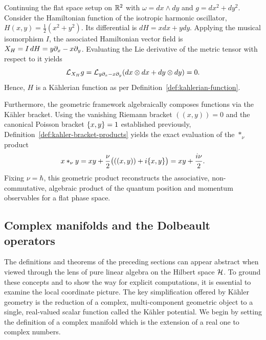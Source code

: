 \begin{example}
	Continuing the flat space setup on $\mathbb{R}^2$ with $\omega=dx\wedge dy$ and $g=dx^2+dy^2$. Consider the Hamiltonian function of the isotropic harmonic oscillator, $H(x,y) = \frac{1}{2}(x^2 + y^2)$.
	Its differential is $dH = x dx + y dy$. Applying the musical isomorphism $I$, the associated Hamiltonian vector field is $X_{H} = I\,dH = y\partial_x - x\partial_y$. 
	Evaluating the Lie derivative of the metric tensor with respect to it yields
	\begin{equation}
		\mathcal{L}_{\Ham{H}} g = \mathcal{L}_{y\partial_x - x\partial_y} (dx \otimes dx + dy \otimes dy) = 0.
	\end{equation}
	Hence, $H$ is a Kählerian function as per Definition~\ref{def:kahlerian-function}. 
	
	Furthermore, the geometric framework algebraically composes functions via the Kähler bracket. Using the vanishing Riemann bracket $((x,y))=0$ and the canonical Poisson bracket $\{x,y\}=1$ established previously, Definition~\ref{def:kahler-bracket-products} yields the exact evaluation of the $*_\nu$ product
	\begin{equation}
		x *_\nu y = xy + \frac{\nu}{2}\big(((x,y)) + i\{x,y\}\big) = xy + \frac{i\nu}{2}.
	\end{equation}
	Fixing $\nu = \hbar$, this geometric product reconstructs the associative, non-commutative, algebraic product of the quantum position and momentum observables for a flat phase space.
\end{example}

\subsection*{Complex manifolds and the Dolbeault operators}
\label{sec:complex-manifolds-dolbeault}

The definitions and theorems of the preceding sections can appear abstract when viewed through the lens of pure linear algebra on the Hilbert space $\H$. To ground these concepts and to show the way for explicit computations, it is essential to examine the local coordinate picture. The key simplification offered by Kähler geometry is the reduction of a complex, multi-component geometric object to a single, real-valued scalar function called the Kähler potential.
We begin by setting the definition of a complex manifold which is the extension of a real one to complex numbers.

